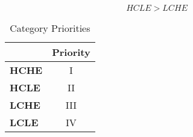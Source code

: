\begin{definition}
\[\textrm{$HCLE > LCHE$} \]
 
\begin{table}[h]
\captionsetup{justification=centering}
\centering
\begin{tabular}{l|c|}
\cline{2-2}
                                          & \multicolumn{1}{l|}{\textbf{Priority}} \\ \hline
\multicolumn{1}{|l|}{\textbf{HCHE}}  & I                                      \\ \hline
\multicolumn{1}{|l|}{\textbf{HCLE}}  & II                                     \\ \hline
\multicolumn{1}{|l|}{\textbf{LCHE}} & III                                     \\ \hline
\multicolumn{1}{|l|}{\textbf{LCLE}} & IV                                      \\ \hline
\end{tabular}

\caption{Category Priorities} %
\label{tbl:priority} %

\end{table} 

\end{definition}




